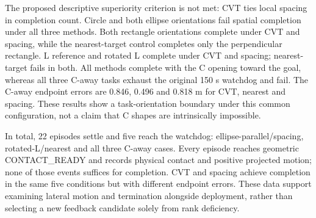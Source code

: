 The proposed descriptive superiority criterion is not met: CVT ties local spacing in completion count. Circle and both ellipse orientations fail spatial completion under all three methods. Both rectangle orientations complete under CVT and spacing, while the nearest-target control completes only the perpendicular rectangle. L reference and rotated L complete under CVT and spacing; nearest-target fails in both. All methods complete with the C opening toward the goal, whereas all three C-away tasks exhaust the original 150 s watchdog and fail. The C-away endpoint errors are 0.846, 0.496 and 0.818 m for CVT, nearest and spacing. These results show a task-orientation boundary under this common configuration, not a claim that C shapes are intrinsically impossible.

In total, 22 episodes settle and five reach the watchdog: ellipse-parallel/spacing, rotated-L/nearest and all three C-away cases. Every episode reaches geometric CONTACT\_READY and records physical contact and positive projected motion; none of those events suffices for completion. CVT and spacing achieve completion in the same five conditions but with different endpoint errors. These data support examining lateral motion and termination alongside deployment, rather than selecting a new feedback candidate solely from rank deficiency.

